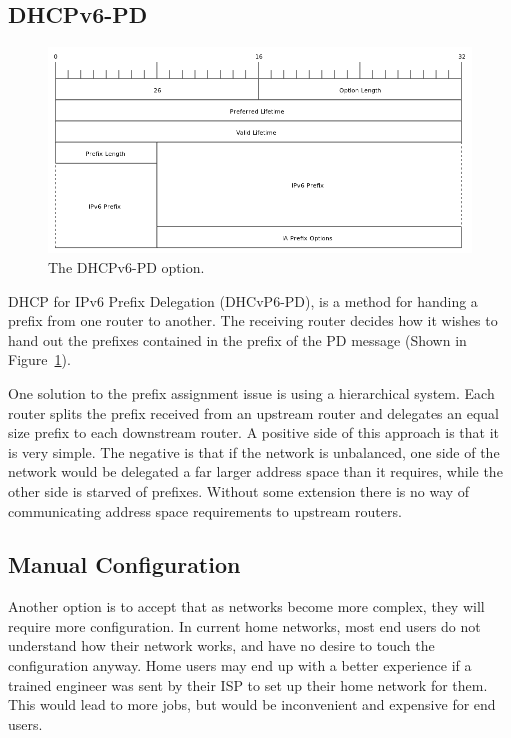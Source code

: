 \subsection{DHCPv6-PD}
\begin{figure}
\begin{center}
	\includegraphics[width=\linewidth]{../Diagrams/Packets/pd-option.png}
	\caption{The DHCPv6-PD option.}\label{fig:pd-option}
\end{center}
\end{figure}
DHCP for IPv6 Prefix Delegation (DHCvP6-PD), is a method for handing a prefix from one router to
another. The receiving router decides how it wishes to hand out the prefixes
contained in the prefix of the PD message (Shown in Figure~\ref{fig:pd-option}). 

One solution to the prefix assignment issue is using a hierarchical system.
Each router splits the prefix received from an upstream router and delegates an
equal size prefix to each downstream router. A positive side of this approach
is that it is very simple. The negative is that if the network is unbalanced,
one side of the network would be delegated a far larger address space than it
requires, while the other side is starved of prefixes.  Without some extension
there is no way of communicating address space requirements to upstream
routers.   

\subsection{Manual Configuration}
Another option is to accept that as networks become more complex, they will
require more configuration. In current home networks, most end users do not
understand how their network works, and have no desire to touch the
configuration anyway. Home users may end up with a better experience if a
trained engineer was sent by their ISP to set up their home network for them.
This would lead to more jobs, but would be inconvenient and expensive for end
users.

